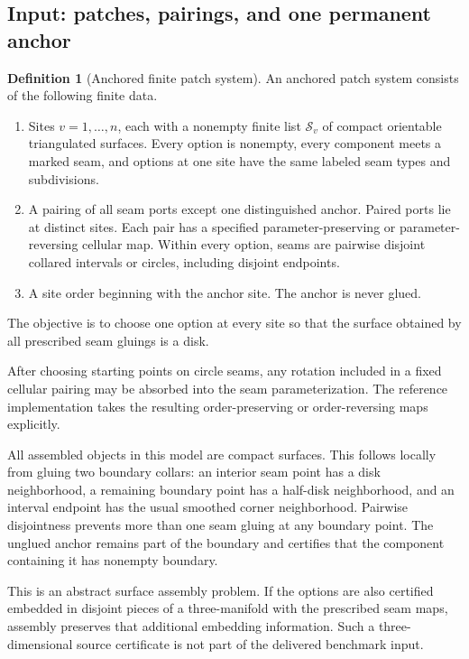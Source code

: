 \documentclass[11pt,letterpaper]{article}
\theoremstyle{definition}
\newtheorem{definition}[theorem]{Definition}
\begin{document}
\subsection{Input: patches, pairings, and one permanent anchor}
\begin{definition}[Anchored finite patch system]\label{def:patch}
An anchored patch system consists of the following finite data.
\begin{enumerate}
\item Sites $v=1,\ldots,n$, each with a nonempty finite list $\mathcal S_v$ of compact orientable triangulated surfaces. Every option is nonempty, every component meets a marked seam, and options at one site have the same labeled seam types and subdivisions.
\item A pairing of all seam ports except one distinguished anchor. Paired ports lie at distinct sites. Each pair has a specified parameter-preserving or parameter-reversing cellular map. Within every option, seams are pairwise disjoint collared intervals or circles, including disjoint endpoints.
\item A site order beginning with the anchor site. The anchor is never glued.
\end{enumerate}
The objective is to choose one option at every site so that the surface obtained by all prescribed seam gluings is a disk.
\end{definition}
After choosing starting points on circle seams, any rotation included in a fixed cellular pairing may be absorbed into the seam parameterization. The reference implementation takes the resulting order-preserving or order-reversing maps explicitly.

All assembled objects in this model are compact surfaces. This follows locally from gluing two boundary collars: an interior seam point has a disk neighborhood, a remaining boundary point has a half-disk neighborhood, and an interval endpoint has the usual smoothed corner neighborhood. Pairwise disjointness prevents more than one seam gluing at any boundary point. The unglued anchor remains part of the boundary and certifies that the component containing it has nonempty boundary.

This is an abstract surface assembly problem. If the options are also certified embedded in disjoint pieces of a three-manifold with the prescribed seam maps, assembly preserves that additional embedding information. Such a three-dimensional source certificate is not part of the delivered benchmark input.
\end{document}
